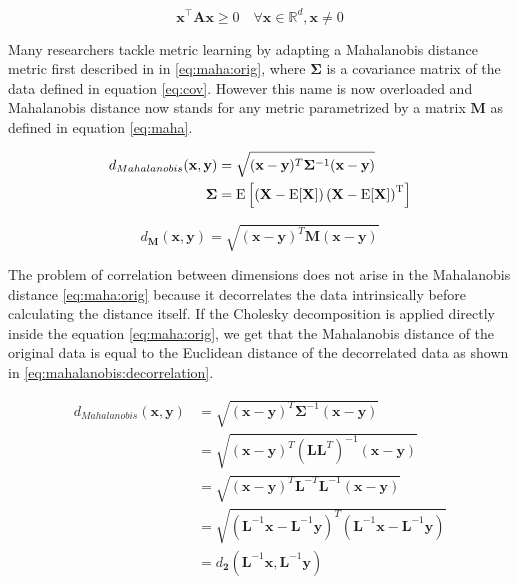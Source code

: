\documentclass[12pt,a4paper]{report}
\begin{document}
\begin{equation}
\bm{x}^\top \bm{A}\bm{x} \geq 0 \quad \forall \bm{x} \in \mathbb{R}^d, \bm{x} \neq 0 \label{eq:psd:def}
\end{equation}


Many researchers tackle metric learning by adapting a Mahalanobis distance metric first described in \cite{mahalanobis1936generalized} in \ref{eq:maha:orig}, where $\bm{\Sigma}$ is a covariance matrix of the data defined in equation \ref{eq:cov}. However this name is now overloaded and Mahalanobis distance now stands for any metric parametrized by a matrix $\bm{M}$ as defined in equation \ref{eq:maha}.

\begin{align} \label{eq:maha:orig}
d_{Mahalanobis}(\textbf{x},\textbf{y}) &= \sqrt{(\textbf{x}-\textbf{y})^T\bm{\Sigma}^{-1}(\textbf{x}-\textbf{y})}  \\
\bm{\Sigma} &= \mathrm {E} \left[\left(\mathbf {X} -\mathrm {E} [\mathbf {X} ]\right)\left(\mathbf {X} -\mathrm {E} [\mathbf {X} ]\right)^{\rm {T}}\right] \label{eq:cov}
\end{align}

\begin{equation} \label{eq:maha}
d_{\bm{M}}(\textbf{x},\textbf{y}) = \sqrt{(\textbf{x}-\textbf{y})^T\bm{M}(\textbf{x}-\textbf{y})} 
\end{equation}

The problem of correlation between dimensions does not arise in the Mahalanobis distance \eqref{eq:maha:orig} because it decorrelates the data intrinsically before calculating the distance itself. If the Cholesky decomposition is applied directly inside the equation \ref{eq:maha:orig}, we get that the Mahalanobis distance of the original data is equal to the Euclidean distance of the decorrelated data as shown in \ref{eq:mahalanobis:decorrelation}.

\begin{align}
  d_{Mahalanobis}(\textbf{x},\textbf{y}) &= \sqrt{(\textbf{x}-\textbf{y})^{T}\bm{\Sigma}^{-1}(\textbf{x}-\textbf{y})} \nonumber\\
         &= \sqrt{(\textbf{x}-\textbf{y})^{T}(\bm{L}\bm{L}^{T})^{-1}(\textbf{x}-\textbf{y})} \nonumber\\
         &= \sqrt{(\textbf{x}-\textbf{y})^{T}\bm{L}^{-T}\bm{L}^{-1}(\textbf{x}-\textbf{y})} \nonumber\\
         &= \sqrt{(\bm{L}^{-1}\textbf{x}-\bm{L}^{-1}\textbf{y})^{T}(\bm{L}^{-1}\textbf{x}-\bm{L}^{-1}\textbf{y})} \nonumber\\
         &= d_{\bm{2}}(\bm{L}^{-1}\textbf{x}, \bm{L}^{-1}\textbf{y}) \label{eq:mahalanobis:decorrelation}
\end{align}
\end{document}
